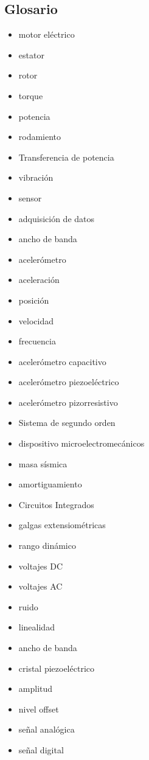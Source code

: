 
\subsection{Glosario}

\begin{itemize}
    \item motor eléctrico
    \item estator
    \item rotor
    \item torque
    \item potencia
    \item rodamiento
    \item Transferencia de potencia
    \item vibración
    \item sensor
    \item adquisición de datos
    \item ancho de banda
    \item acelerómetro
    \item aceleración
    \item posición
    \item velocidad
    \item frecuencia
    \item acelerómetro capacitivo
    \item acelerómetro piezoeléctrico
    \item acelerómetro pizorresistivo
    \item Sistema de segundo orden
    \item dispositivo microelectromecánicos
    \item masa sísmica
    \item amortiguamiento
    \item Circuitos Integrados
    \item galgas extensiométricas
    \item rango dinámico
    \item voltajes DC
    \item voltajes AC
    \item ruido
    \item linealidad
    \item ancho de banda
    \item cristal piezoeléctrico
    \item amplitud
    \item nivel offset
    \item señal analógica
    \item señal digital

\end{itemize}
